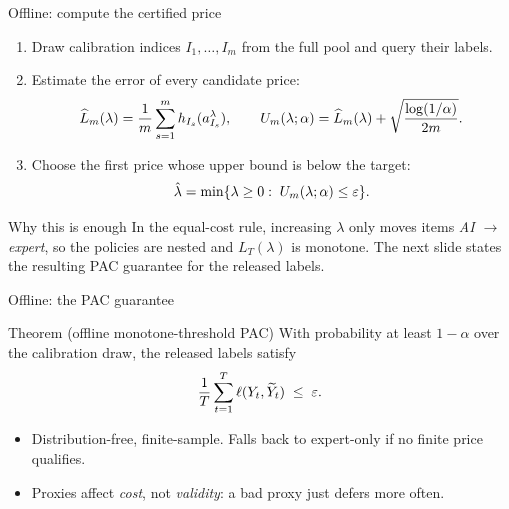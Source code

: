 \begin{frame}{Offline: compute the certified price}
  \small
  \setlength{\abovedisplayskip}{4pt}
  \setlength{\belowdisplayskip}{4pt}
  \begin{enumerate}
    \item Draw calibration indices \(I_1,\ldots,I_m\) from the full pool and
          query their labels.
    \item Estimate the error of every candidate price:
      \[
          \widehat L_m(\lambda)=\frac1m\sum_{s=1}^m h_{I_s}(a_{I_s}^\lambda),
          \qquad
          U_m(\lambda;\alpha)=
          \widehat L_m(\lambda)+\sqrt{\frac{\log(1/\alpha)}{2m}}.
      \]
    \item Choose the first price whose upper bound is below the target:
      \[
          \hat\lambda
          =
          \min\{\lambda\ge0:\; U_m(\lambda;\alpha)\le\varepsilon\}.
      \]
  \end{enumerate}
  \vspace{-1mm}
  \begin{block}{Why this is enough}
    In the equal-cost rule, increasing \(\lambda\) only moves items
    \emph{AI \(\to\) expert}, so the policies are nested and
    \(L_T(\lambda)\) is monotone. The next slide states the resulting PAC
    guarantee for the released labels.
  \end{block}
\end{frame}

\begin{frame}{Offline: the PAC guarantee}
  \begin{block}{Theorem (offline monotone-threshold PAC)}
    With probability at least $1-\alpha$ over the calibration draw, the released
    labels satisfy
    \[
       \frac1T\sum_{t=1}^{T}\ell(Y_t,\widetilde Y_t)\;\le\;\varepsilon.
    \]
  \end{block}
  \begin{itemize}
    \item Distribution-free, finite-sample. Falls back to expert-only if no
          finite price qualifies.
    \item Proxies affect \emph{cost}, not \emph{validity}: a bad proxy just
          defers more often.
  \end{itemize}
\end{frame}

